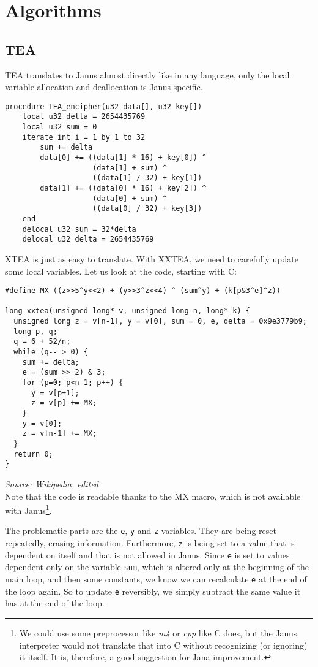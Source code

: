 \documentclass[a4paper,10pt,openright]{memoir}
\newcommand{\term}[1]{\textit{#1}}
\newcommand{\code}[1]{\texttt{#1}}
\begin{document}
\section{Algorithms}

\subsection{TEA}
\label{sec:impl:tea}

TEA translates to Janus almost directly like in any language, only the 
local variable allocation and deallocation is Janus-specific.

\begin{lstlisting}[language=Janus]
procedure TEA_encipher(u32 data[], u32 key[])
    local u32 delta = 2654435769
    local u32 sum = 0
    iterate int i = 1 by 1 to 32
        sum += delta
        data[0] += ((data[1] * 16) + key[0]) ^
                    (data[1] + sum) ^
                    ((data[1] / 32) + key[1])
        data[1] += ((data[0] * 16) + key[2]) ^
                    (data[0] + sum) ^
                    ((data[0] / 32) + key[3])
    end
    delocal u32 sum = 32*delta
    delocal u32 delta = 2654435769
\end{lstlisting}

XTEA is just as easy to translate. With XXTEA, we need to carefully 
update some local variables. Let us look at the code, starting with C:

\begin{lstlisting}
#define MX ((z>>5^y<<2) + (y>>3^z<<4) ^ (sum^y) + (k[p&3^e]^z))

long xxtea(unsigned long* v, unsigned long n, long* k) {
  unsigned long z = v[n-1], y = v[0], sum = 0, e, delta = 0x9e3779b9;
  long p, q;
  q = 6 + 52/n;
  while (q-- > 0) {
    sum += delta;
    e = (sum >> 2) & 3;
    for (p=0; p<n-1; p++) {
      y = v[p+1];
      z = v[p] += MX;
    }
    y = v[0];
    z = v[n-1] += MX;
  }
  return 0;
}
\end{lstlisting}
\textit{\footnotesize Source: Wikipedia, edited}\\

Note that the code is readable thanks to the MX macro, which is not 
available with Janus\footnote{We could use some preprocessor like 
\term{m4} or \term{cpp} like C does, but the Janus interpreter would 
not translate that into C without recognizing (or ignoring) it 
itself. It is, therefore, a good suggestion for Jana improvement.}.

The problematic parts are the \code{e}, \code{y} and \code{z} 
variables. They are being reset repeatedly, erasing information. 
Furthermore, \code{z} is being set to a value that is dependent on 
itself and that is not allowed in Janus. Since \code{e} is set to 
values dependent only on the variable \code{sum}, which is altered only 
at the beginning of the main loop, and then some constants, we know we 
can recalculate \code{e} at the end of the loop again. So to update 
\code{e} reversibly, we simply subtract the same value it has at the 
end of the loop.
\end{document}
